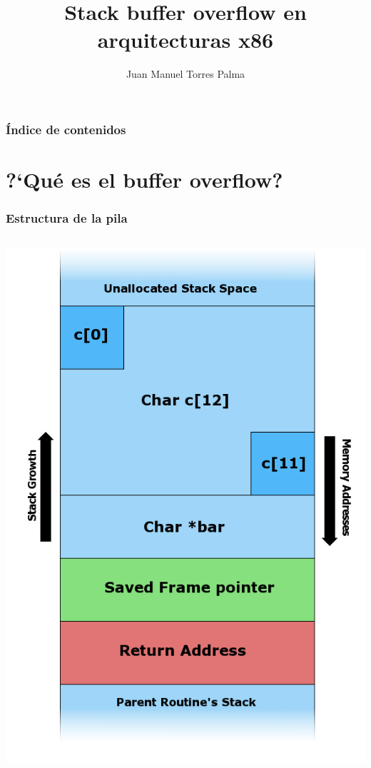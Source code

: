 \documentclass{beamer}
\title{Stack buffer overflow en arquitecturas x86}
\author{Juan Manuel Torres Palma}
\begin{document}
\ttfamily %
\frame{\titlepage}

\begin{frame}
\frametitle{\'Indice de contenidos}
\tableofcontents[currentsection]
\end{frame}


\section{?`Qu\'e es el buffer overflow?}
\begin{frame}
\frametitle{Estructura de la pila}
\begin{columns}[t] %
     \begin{column}[T]{4cm} %
     	\includegraphics[scale=0.2]{Stack_Overflow_2.png}
     \end{column}

\end{columns}
\end{frame}
\end{document}
